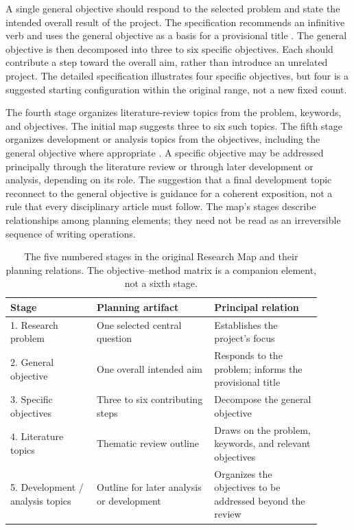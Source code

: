 A single general objective should respond to the selected problem and state the intended overall result of the project. The specification recommends an infinitive verb and uses the general objective as a basis for a provisional title \cite{franca2026map,franca2026detail}. The general objective is then decomposed into three to six specific objectives. Each should contribute a step toward the overall aim, rather than introduce an unrelated project. The detailed specification illustrates four specific objectives, but four is a suggested starting configuration within the original range, not a new fixed count.

The fourth stage organizes literature-review topics from the problem, keywords, and objectives. The initial map suggests three to six such topics. The fifth stage organizes development or analysis topics from the objectives, including the general objective where appropriate \cite{franca2026map}. A specific objective may be addressed principally through the literature review or through later development or analysis, depending on its role. The suggestion that a final development topic reconnect to the general objective is guidance for a coherent exposition, not a rule that every disciplinary article must follow. The map's stages describe relationships among planning elements; they need not be read as an irreversible sequence of writing operations.

\begin{table}[htbp]
\centering
\small
\caption{The five numbered stages in the original Research Map and their planning relations. The objective--method matrix is a companion element, not a sixth stage.}
\label{tab:method-stages}
\begin{tabular}{p{0.25\linewidth} p{0.34\linewidth} p{0.31\linewidth}}
\hline
Stage & Planning artifact & Principal relation \\
\hline
1. Research problem & One selected central question & Establishes the project's focus \\
2. General objective & One overall intended aim & Responds to the problem; informs the provisional title \\
3. Specific objectives & Three to six contributing steps & Decompose the general objective \\
4. Literature topics & Thematic review outline & Draws on the problem, keywords, and relevant objectives \\
5. Development / analysis topics & Outline for later analysis or development & Organizes the objectives to be addressed beyond the review \\
\hline
\end{tabular}
\end{table}

